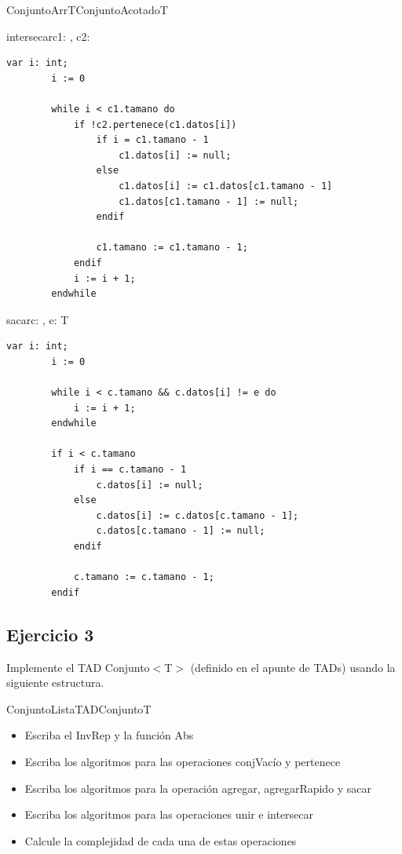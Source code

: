 \begin{module}{ConjuntoArr}{T}{ConjuntoAcotado}{T}
	\pagebreak

	\begin{proc}{intersecar}{\Inout c1: \moduletype, \In c2: \moduletype}{}
		\begin{lstlisting}[numbers=none,frame=none]
		var i: int;
		i := 0

		while i < c1.tamano do
			if !c2.pertenece(c1.datos[i])
				if i = c1.tamano - 1
					c1.datos[i] := null;
				else
					c1.datos[i] := c1.datos[c1.tamano - 1]
					c1.datos[c1.tamano - 1] := null;
				endif

				c1.tamano := c1.tamano - 1;
			endif
			i := i + 1;
		endwhile
		\end{lstlisting}
	\end{proc}

	\begin{proc}{sacar}{\Inout c: \moduletype, \In e: T}{}
		\begin{lstlisting}[numbers=none,frame=none]
		var i: int;
		i := 0

		while i < c.tamano && c.datos[i] != e do
			i := i + 1;
		endwhile

		if i < c.tamano
			if i == c.tamano - 1
				c.datos[i] := null;
			else
				c.datos[i] := c.datos[c.tamano - 1];
				c.datos[c.tamano - 1] := null;
			endif

			c.tamano := c.tamano - 1;
		endif
		\end{lstlisting}
	\end{proc}
\end{module}

\subsection{Ejercicio 3}
Implemente el TAD Conjunto$<$T$>$ (definido en el apunte de TADs) usando la siguiente estructura.

\begin{module}{ConjuntoLista}{TAD}{Conjunto}{T}
\end{module}

\begin{itemize}
	\item Escriba el InvRep y la función Abs
	\item Escriba los algoritmos para las operaciones conjVacío y pertenece
	\item Escriba los algoritmos para la operación agregar, agregarRapido y sacar
	\item Escriba los algoritmos para las operaciones unir e intersecar
	\item Calcule la complejidad de cada una de estas operaciones
\end{itemize}

